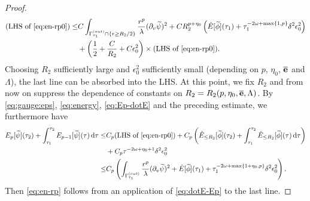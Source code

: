 \documentclass[10pt, reqno]{amsart}
\theoremstyle{definition}
\theoremstyle{remark}
\theoremstyle{conjecture}
\numberwithin{equation}{section}
\newcommand{\set}[1]{\{#1\}}
\newcommand{\ud}{\mathrm{d}}
\newcommand{\rd}{\partial}
\newcommand{\0}{\emptyset}
\newcommand{\Gmm}{\Gamma}
\newcommand{\dlt}{\delta}
\newcommand{\eps}{\epsilon}
\newcommand{\lmb}{\lambda}
\newcommand{\Lmb}{\Lambda}
\newcommand{\omg}{\omega}
\newcommand{\bfe}{{\bf e}}
\newcommand{\dvr}{\lmb}
\newcommand{\e}{\bfe}							%
\newcommand{\phibg}{\overline{\phi}}				%
\newcommand{\psibg}{\overline{\psi}}				%
\newcommand{\ebg}{\overline{\e}}					%
\newcommand{\phidf}{\widetilde{\phi}}				%
\newcommand{\psidf}{\widetilde{\psi}}				%
\begin{document}
\begin{proof}
\begin{align*}
	(\hbox{LHS of \eqref{eq:en-rp0}}) 
	\leq & C \int_{\Gmm^{(out)}_{\tau_{1}} \cap \set{r \geq R_{2}/2}} \frac{r^{p}}{\dvr} (\rd_{v} \psidf)^{2} + C R_{2}^{p+\eta_0} \left(\dot{E}[\phidf](\tau_{1}) + \tau_{1}^{-2 \omg + \max \set{1, p}} \dlt^{2} \eps_{0}^{2} \right) \\
	& + \left( \frac{1}{2} + \frac{C}{R_{2}} + C \eps_{0}^{2} \right) \times (\hbox{LHS of \eqref{eq:en-rp0}}).
\end{align*}
Choosing $R_{2}$ sufficiently large and $\eps_{0}^{2}$ sufficiently small (depending on $p$, $\eta_{0}$, $\ebg$ and $\Lmb$), the last line can be absorbed into the LHS. At this point, we fix $R_{2}$ and from now on suppress the dependence of constants on $R_{2} = R_{2}(p, \eta_{0}, \ebg, \Lmb)$. By \eqref{eq:gauge:eps}, \eqref{eq:energy}, \eqref{eq:Ep-dotE} and the preceding estimate, we furthermore have
\begin{align*}
	E_{p}[\psidf](\tau_{2}) + \int_{\tau_{1}}^{\tau_{2}} E_{p-1}[\psidf](\tau) \, \ud \tau
	\leq & C_{p} (\hbox{LHS of \eqref{eq:en-rp0}}) 
		+ C_{p} \left( \dot{E}_{\leq R_{2}}[\phidf](\tau_{2}) + \int_{\tau_{1}}^{\tau_{2}} \dot{E}_{\leq R_{2}}[\phidf](\tau) \, \ud \tau \right) \\
		& + C_{p} \tau^{-2 \omg + \eta_{0} + 1} \dlt^{2} \eps_{0}^{2} \\
	\leq & C_{p} \left( \int_{\Gmm_{\tau_{1}}^{(out)}} \frac{r^{p}}{\dvr} (\rd_{v} \psidf)^{2}  + \dot{E}[\phidf](\tau_{1}) 
		+ \tau_{1}^{-2 \omg + \max \set{1+\eta_{0}, p}} \dlt^{2} \eps_{0}^{2} \right).
\end{align*}
Then \eqref{eq:en-rp} follows from an application of \eqref{eq:dotE-Ep} to the last line.


\end{proof}
\end{document}
